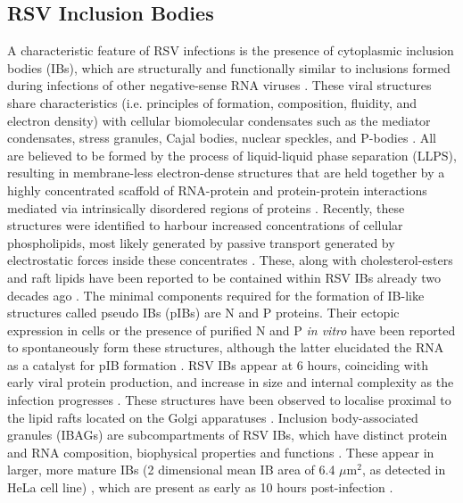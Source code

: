 \subsection{RSV Inclusion Bodies} \label{subsec:RSV Inclusion Bodies}
A characteristic feature of RSV infections is the presence of cytoplasmic inclusion bodies (IBs), which are structurally and functionally similar to inclusions formed during infections of other negative-sense RNA viruses \cite{Fricke2013P38Assembly, Rincheval2017FunctionalVirus, Li2022PhaseInfections}. These viral structures share characteristics (i.e. principles of formation, composition, fluidity, and electron density) with cellular biomolecular condensates such as the mediator condensates, stress granules, Cajal bodies, nuclear speckles, and P-bodies \cite{Dumelie2023BiomolecularMicroenvironments, Garabedian2022ProteinSequences, Darling2023KnownCondensates, Li2022PhaseInfections}. All are believed to be formed by the process of liquid-liquid phase separation (LLPS), resulting in membrane-less electron-dense structures that are held together by a highly concentrated scaffold of RNA-protein and protein-protein interactions mediated via intrinsically disordered regions of proteins \cite{Mohanty2022PrinciplesProteins, Hu2022SequestrationPathological}. Recently, these structures were identified to harbour increased concentrations of cellular phospholipids, most likely generated by passive transport generated by electrostatic forces inside these concentrates \cite{Dumelie2023BiomolecularMicroenvironments}. These, along with cholesterol-esters and raft lipids have been reported to be contained within RSV IBs already two decades ago \cite{Brown2005EvidenceInfection}. The minimal components required for the formation of IB-like structures called pseudo IBs (pIBs) are N and P proteins. Their ectopic expression in cells or the presence of purified N and P \textit{in vitro} have been reported to spontaneously form these structures, although the latter elucidated the RNA as a catalyst for pIB formation \cite{Rincheval2017FunctionalVirus, Galloux2020MinimalVitro}. RSV IBs appear at 6 hours, coinciding with early viral protein production, and increase in size and internal complexity as the infection progresses \cite{Risso-Ballester2023SpatialBodies, Rincheval2017FunctionalVirus}. These structures have been observed to localise proximal to the lipid rafts located on the Golgi apparatuses \cite{McDonald2004EvidenceAnalysis}. Inclusion body-associated granules (IBAGs) are subcompartments of RSV IBs, which have distinct protein and RNA composition, biophysical properties and functions \cite{Rincheval2017FunctionalVirus, Jobe2020RespiratorySignaling}. These appear in larger, more mature IBs (2 dimensional mean IB area of 6.4 \(\mu \mbox{m}^2\), as detected in HeLa cell line) \cite{Rincheval2017FunctionalVirus}, which are present as early as 10 hours post-infection \cite{Jobe2021BovineResponses}.

